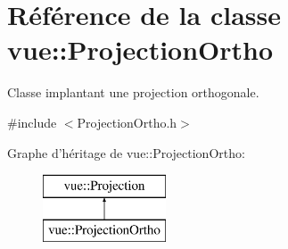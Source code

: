 \hypertarget{classvue_1_1_projection_ortho}{\section{Référence de la classe vue\-:\-:Projection\-Ortho}
\label{classvue_1_1_projection_ortho}
}


Classe implantant une projection orthogonale.  




{\ttfamily \#include $<$Projection\-Ortho.\-h$>$}

Graphe d'héritage de vue\-:\-:Projection\-Ortho\-:\begin{figure}[H]
\begin{center}
\leavevmode
\includegraphics[height=2.000000cm]{classvue_1_1_projection_ortho}
\end{center}
\end{figure}
